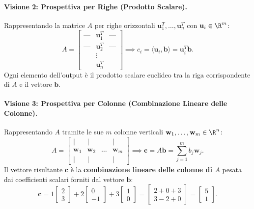 \paragraph{Visione 2: Prospettiva per Righe (Prodotto Scalare).}
Rappresentando la matrice $A$ per righe orizzontali $\mathbf{u}_1^T, \dots, \mathbf{u}_n^T$ con $\mathbf{u}_i \in \R^m$:
\begin{equation}
    A = \begin{bmatrix} \text{---} & \mathbf{u}_1^T & \text{---} \\ \text{---} & \mathbf{u}_2^T & \text{---} \\ & \vdots & \\ \text{---} & \mathbf{u}_n^T & \text{---} \end{bmatrix} \implies c_i = \langle \mathbf{u}_i, \mathbf{b} \rangle = \mathbf{u}_i^T \mathbf{b}.
\end{equation}
Ogni elemento dell'output è il prodotto scalare euclideo tra la riga corrispondente di $A$ e il vettore $\mathbf{b}$.

\paragraph{Visione 3: Prospettiva per Colonne (Combinazione Lineare delle Colonne).}
Rappresentando $A$ tramite le sue $m$ colonne verticali $\mathbf{w}_1, \dots, \mathbf{w}_m \in \R^n$:
\begin{equation}
    A = \begin{bmatrix} | & | & & | \\ \mathbf{w}_1 & \mathbf{w}_2 & \dots & \mathbf{w}_m \\ | & | & & | \end{bmatrix} \implies \mathbf{c} = A \mathbf{b} = \sum_{j=1}^m b_j \mathbf{w}_j.
\end{equation}
Il vettore risultante $\mathbf{c}$ è la \textbf{combinazione lineare delle colonne di $A$} pesata dai coefficienti scalari forniti dal vettore $\mathbf{b}$:
\begin{equation}
    \mathbf{c} = 1 \begin{bmatrix} 2 \\ 3 \end{bmatrix} + 2 \begin{bmatrix} 0 \\ -1 \end{bmatrix} + 3 \begin{bmatrix} 1 \\ 0 \end{bmatrix} = \begin{bmatrix} 2 + 0 + 3 \\ 3 - 2 + 0 \end{bmatrix} = \begin{bmatrix} 5 \\ 1 \end{bmatrix}.
\end{equation}

